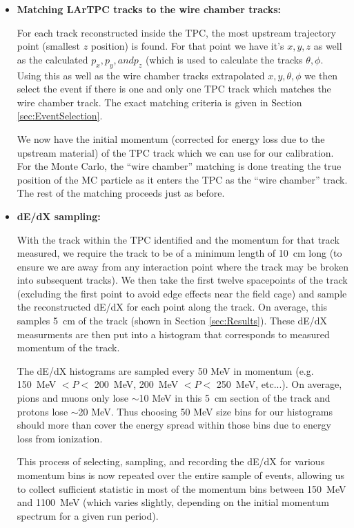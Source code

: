 \begin{itemize}
\item \textbf{Matching LArTPC tracks to the wire chamber tracks:}

For each track reconstructed inside the TPC, the most upstream trajectory point (smallest $z$ position) is found. For that point we have it's $x, y, z$ as well as the calculated $p_{x}, p_{y}, and p_{z}$ (which is used to calculate the tracks $\theta, \phi$. Using this as well as the wire chamber tracks extrapolated $x, y, \theta, \phi$ we then select the event if there is one and only one TPC track which matches the wire chamber track. The exact matching criteria is given in Section \ref{sec:EventSelection}.

We now have the initial momentum (corrected for energy loss due to the upstream material) of the TPC track which we can use for our calibration. For the Monte Carlo, the ``wire chamber'' matching is done treating the true position of the MC particle as it enters the TPC as the ``wire chamber'' track. The rest of the matching proceeds just as before.

\item \textbf{dE/dX sampling:}

With the track within the TPC identified and the momentum for that track measured, we require the track to be of a minimum length of 10~cm long (to ensure we are away from any interaction point where the track may be broken into subsequent tracks). We then take the first twelve spacepoints of the track (excluding the first point to avoid edge effects near the field cage) and sample the reconstructed dE/dX for each point along the track. On average, this samples 5~cm of the track (shown in Section \ref{sec:Results}). These dE/dX measurments are then put into a histogram that corresponds to measured momentum of the track.

The dE/dX histograms are sampled every 50 MeV in momentum (e.g. 150~MeV $< P <$ 200~MeV, 200~MeV $< P <$ 250~MeV, etc...). On average, pions and muons only lose $\sim$10 MeV in this 5~cm section of the track and protons lose $\sim$20 MeV. Thus choosing 50 MeV size bins for our histograms should more than cover the energy spread within those bins due to energy loss from ionization.

This process of selecting, sampling, and recording the dE/dX for various momentum bins is now repeated over the entire sample of events, allowing us to collect sufficient statistic in most of the momentum bins between 150~MeV and 1100~MeV (which varies slightly, depending on the initial momentum spectrum for a given run period).


\end{itemize}
